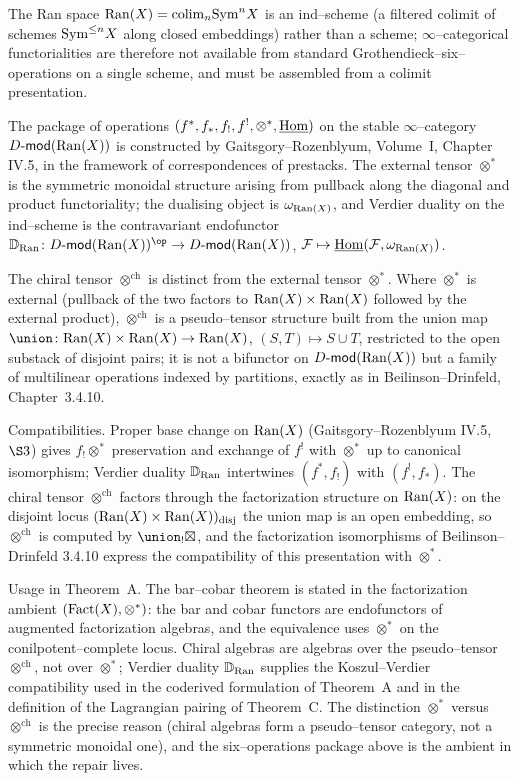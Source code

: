 \begin{remark}
\label{rem:six-operations-on-ran}
The Ran space $\mathrm{Ran}(X) = \mathrm{colim}_n \mathrm{Sym}^n X$ is an
ind--scheme (a filtered colimit of schemes $\mathrm{Sym}^{\le n} X$ along
closed embeddings) rather than a scheme; $\infty$--categorical
functorialities are therefore not available from standard
Grothendieck--six--operations on a single scheme, and must be
assembled from a colimit presentation.

The package of operations $(f^*, f_*, f_!, f^!, \otimes^*, \underline{\mathrm{Hom}})$
on the stable $\infty$--category $D\text{-}\mathsf{mod}(\mathrm{Ran}(X))$ is constructed by
Gaitsgory--Rozenblyum, Volume~I, Chapter IV.5, in the framework of
correspondences of prestacks. The external tensor $\otimes^*$ is the
symmetric monoidal structure arising from pullback along the
diagonal and product functoriality; the dualising object is
$\omega_{\mathrm{Ran}(X)}$, and Verdier duality on the ind--scheme is the
contravariant endofunctor
$\D_{\Ran}\colon \DMod(\Ran(X))^{\op}\to \DMod(\Ran(X))$,
$\mathcal F \mapsto \underline{\mathrm{Hom}}(\mathcal F, \omega_{\mathrm{Ran}(X)})$.

The chiral tensor $\otimes^{\mathrm{ch}}$ is distinct from the
external tensor $\otimes^*$. Where $\otimes^*$ is external (pullback
of the two factors to $\mathrm{Ran}(X)\times \mathrm{Ran}(X)$ followed by the
external product), $\otimes^{\mathrm{ch}}$ is a pseudo--tensor
structure built from the union map
$\union\colon \Ran(X)\times \Ran(X) \to \Ran(X)$,
$(S,T)\mapsto S\cup T$, restricted to the open substack of disjoint
pairs; it is not a bifunctor on $D\text{-}\mathsf{mod}(\mathrm{Ran}(X))$ but a family of
multilinear operations indexed by partitions, exactly as in
Beilinson--Drinfeld, Chapter~3.4.10.

Compatibilities. Proper base change on $\mathrm{Ran}(X)$ (Gaitsgory--Rozenblyum
IV.5, $\S 3$) gives $f_! \otimes^*$ preservation and exchange of $f^!$
with $\otimes^*$ up to canonical isomorphism; Verdier duality $\mathbb{D}_{\mathrm{Ran}}$
intertwines $(f^*, f_!)$ with $(f^!, f_*)$. The chiral tensor
$\otimes^{\mathrm{ch}}$ factors through the factorization structure on
$\mathrm{Ran}(X)$: on the disjoint locus $(\mathrm{Ran}(X)\times \mathrm{Ran}(X))_{\mathrm{disj}}$
the union map is an open embedding, so $\otimes^{\mathrm{ch}}$ is
computed by $\union_! \boxtimes$, and the factorization isomorphisms
of Beilinson--Drinfeld 3.4.10 express the compatibility of this
presentation with $\otimes^*$.

Usage in Theorem~A. The bar--cobar theorem is stated in the
factorization ambient $(\mathrm{Fact}(X),\otimes^*)$: the bar and cobar
functors are endofunctors of augmented factorization algebras, and
the equivalence uses $\otimes^*$ on the conilpotent--complete locus.
Chiral algebras are algebras over the pseudo--tensor
$\otimes^{\mathrm{ch}}$, not over $\otimes^*$; Verdier duality
$\mathbb{D}_{\mathrm{Ran}}$ supplies the Koszul--Verdier compatibility used in the
coderived formulation of Theorem~A and in the definition of the
Lagrangian pairing of Theorem~C. The distinction $\otimes^*$ versus
$\otimes^{\mathrm{ch}}$ is the precise reason (chiral algebras
form a pseudo--tensor category, not a symmetric monoidal one), and the
six--operations package above is the ambient in which the repair lives.
\end{remark}

